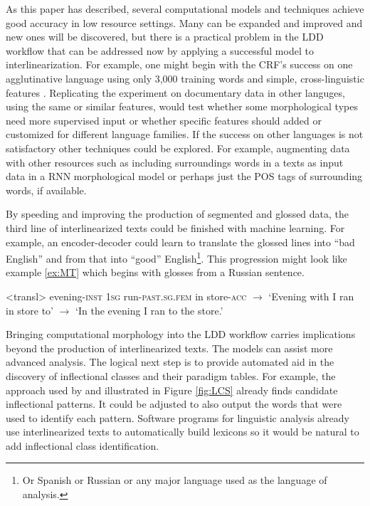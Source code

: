 \documentclass[12pt]{article}
\begin{document}
As this paper has described, several computational models and techniques achieve good accuracy in low resource settings. Many can be expanded and improved and new ones will be discovered, but there is a practical problem in the LDD workflow that can be addressed now by applying a successful model to interlinearization. For example, one might begin with the CRF's success on one agglutinative language using only 3,000 training words and simple, cross-linguistic features \cite{moeller_automatic_2018}. Replicating the experiment on documentary data in other languges, using the same or similar features, would test whether some morphological types need more supervised input or whether specific features should added or customized for different language families. If the success on other languages is not satisfactory other techniques could be explored. For example, augmenting data with other resources such as including surroundings words in a texts as input data in a RNN morphological model or perhaps just the POS tags of surrounding words, if available. 

By speeding and improving the production of segmented and glossed data, the third line of interlinearized texts could be finished with machine learning. For example, an encoder-decoder could learn to translate the glossed lines into ``bad English'' and from that into ``good'' English\footnote{Or Spanish or Russian or any major language used as the language of analysis.}. This progression might look like example \ref{ex:MT} which begins with glosses from a Russian sentence.

\begin{singlespace}
\pex<transl> 
\label{ex:MT}
evening\textsc{-inst} \textsc{1sg} run\textsc{-past.sg.fem} in store\textsc{-acc} $\longrightarrow$ 
`Evening with I ran in store to' $\longrightarrow$
`In the evening I ran to the store.'
\xe
\end{singlespace}

Bringing computational morphology into the LDD workflow carries implications beyond the production of interlinearized texts. The models can assist more advanced analysis. The logical next step is to provide automated aid in the discovery of inflectional classes and their paradigm tables. For example, the approach used by  and illustrated in Figure \ref{fig:LCS} already finds candidate inflectional patterns. It could be adjusted to also output the words that were used to identify each pattern. Software programs for linguistic analysis already use interlinearized texts to automatically build lexicons so it would be natural to add inflectional class identification. 
\end{document}
